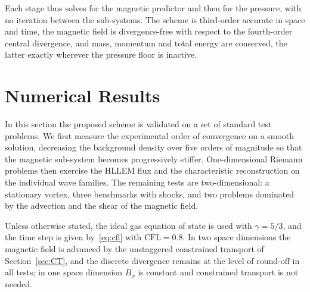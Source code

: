 \documentclass[a4paper,fleqn]{cas-sc}
\theoremstyle{remark}
\begin{document}
\begin{enumerate}[leftmargin=2.2em]
\end{enumerate}

Each stage thus solves for the magnetic predictor and then for the pressure,
with no iteration between the sub-systems. The scheme is
third-order accurate in space and time, the magnetic field is divergence-free
with respect to the fourth-order central divergence, and mass, momentum and
total energy are conserved, the latter exactly wherever the pressure floor is
inactive.




 
\section{Numerical Results}\label{sec:result}

In this section the proposed scheme is validated on a set of standard test
problems. We first measure the experimental order of convergence on a smooth
solution, decreasing the background density over five orders of magnitude so
that the magnetic sub-system becomes progressively stiffer. One-dimensional
Riemann problems then exercise the HLLEM flux and the characteristic
reconstruction on the individual wave families. The remaining tests are
two-dimensional: a stationary vortex, three benchmarks with shocks, and two
problems dominated by the advection and the shear of the magnetic field.

Unless otherwise stated, the ideal gas equation of state is used with
$\gamma=5/3$, and the time step is given by~\eqref{eq:cfl} with
$\mathrm{CFL}=0.8$.
In two space dimensions the magnetic field is advanced by the unstaggered
constrained transport of Section~\ref{sec:CT},
and the discrete divergence remains at the level of round-off in all tests; in
one space dimension $B_x$ is constant and constrained transport is not needed.
\end{document}
